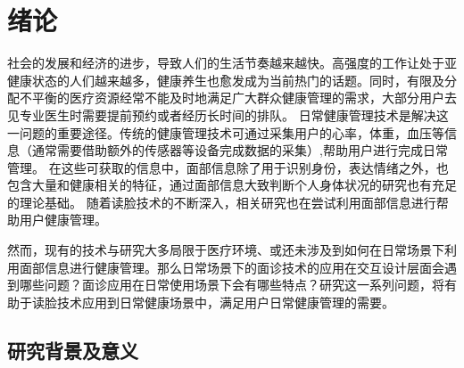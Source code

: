 \chapter{绪论}



社会的发展和经济的进步，导致人们的生活节奏越来越快。高强度的工作让处于亚健康状态的人们越来越多，健康养生也愈发成为当前热门的话题。同时，有限及分配不平衡的医疗资源经常不能及时地满足广大群众健康管理的需求，大部分用户去见专业医生时需要提前预约或者经历长时间的排队\cite{雷鹏中国医疗资源配置与服务利用现状评价}。
日常健康管理技术是解决这一问题的重要途径。传统的健康管理技术可通过采集用户的心率，体重，血压等信息\cite{Liu2014Computerized, Wang2004An, Shu2007Developing}（通常需要借助额外的传感器等设备完成数据的采集）,帮助用户进行完成日常管理。
在这些可获取的信息中，面部信息除了用于识别身份，表达情绪之外，也包含大量和健康相关的特征，通过面部信息大致判断个人身体状况的研究也有充足的理论基础\cite{杨淑芳2002伤寒六经辨证初探, Clifford2006Shortliffe}。
随着读脸技术的不断深入，相关研究也在尝试利用面部信息进行帮助用户健康管理。


然而，现有的技术与研究大多局限于医疗环境、或还未涉及到如何在日常场景下利用面部信息进行健康管理。那么日常场景下的面诊技术的应用在交互设计层面会遇到哪些问题？面诊应用在日常使用场景下会有哪些特点？研究这一系列问题，将有助于读脸技术应用到日常健康场景中，满足用户日常健康管理的需要。


\section{研究背景及意义}

